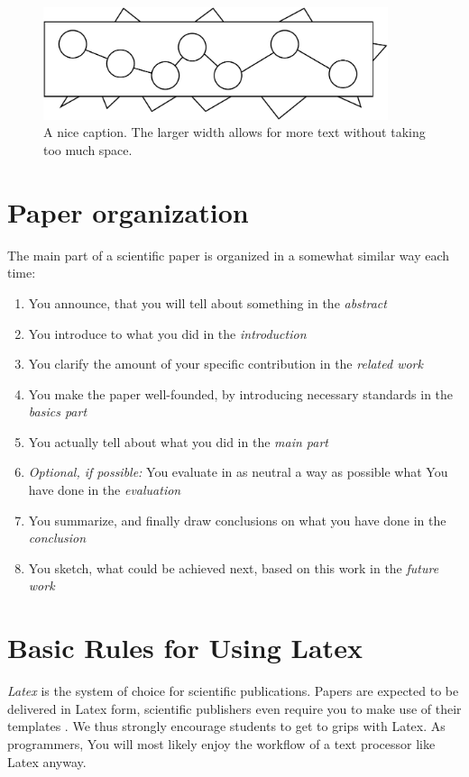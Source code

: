 \documentclass[twocolumn]{article}
\begin{document}
\begin{figure}[t]
\centerline{
\includegraphics[width=0.9\textwidth]{Figures/test.pdf}
}
\caption{A nice caption. The larger width allows for more text without
taking too much space.}
\label{Fig2}
\end{figure}

\section{Paper organization}
The main part of a scientific paper is organized in a somewhat similar way
each time:
\begin{enumerate}
\item You announce, that you will tell about something in the \emph{abstract}
\item You introduce to what you did in the \emph{introduction}
\item You clarify the amount of your specific contribution in the \emph{related work}
\item You make the paper well-founded, by introducing necessary standards in the \emph{basics part}
\item You actually tell about what you did in the \emph{main part}
\item \emph{Optional, if possible:} You evaluate in as neutral a way as possible what You have done in the \emph{evaluation}
\item You summarize, and finally draw conclusions on what you have done in the \emph{conclusion}
\item You sketch, what could be achieved next, based on this work in the \emph{future work}
\end{enumerate}

\section{Basic Rules for Using Latex}

\emph{Latex} is the system of choice for scientific publications. Papers
are expected to be delivered in Latex form, scientific publishers
even require you to make use of their templates \cite{springer,acm}.
We thus strongly encourage students to get to grips with Latex. As
programmers, You will most likely enjoy the workflow of a text
processor like Latex anyway.
\end{document}
